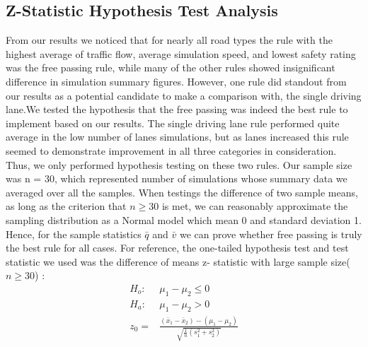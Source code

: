 \documentclass{amsart}
\begin{document}
	\subsection{Z-Statistic Hypothesis Test Analysis}
	From our results we noticed that for nearly all road types the rule with the highest average of traffic flow, average simulation speed, and lowest safety rating was the free passing rule, while many of the other rules showed insignificant difference in simulation summary figures. However, one rule did standout from our results as a potential candidate to make a comparison with, the single driving lane.We tested the hypothesis that the free passing was indeed the best rule to implement based on our results. The single driving lane rule performed quite average in the low number of lanes simulations, but as lanes increased this rule seemed to demonstrate improvement in all three categories in consideration. Thus, we only performed hypothesis testing on these two rules. Our sample size was n = 30, which represented number of simulations whose summary data we averaged over all the samples. When testings the difference of two sample means, as long as the criterion that $n \geq 30$ is met, we can  reasonably approximate the sampling distribution as a Normal model which mean 0 and standard deviation 1. Hence, for the sample statistics $\bar q$ and $\bar v$ we can prove whether free passing is truly the best rule for all cases. For reference, the one-tailed hypothesis test and test statistic we used was the difference of means z- statistic with large sample size($n\geq30$) \cite{FundTrafficEng}: 	
	\begin{align*}
		H_o : &\mu_1 - \mu_2 \leq 0\\
		H_a : &\mu_1 - \mu_2 >0\\
		z_0 = &\frac{(\bar x_1 - \bar x_2) - (\mu_1 - \mu_2)}{\sqrt{\frac{1}{n}(s_1^2 + s_2^2)}}
	\end{align*}
	
\end{document}
